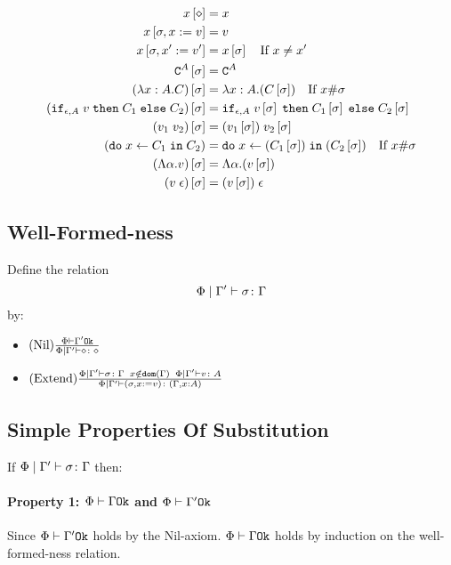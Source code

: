 {        
        \begin{align}
            x\left[\diamond\right] & = x \\
            x\left[\sigma,x:= v\right] & = v \\
            x\left[\sigma,x':= v'\right] & = x\left[\sigma\right]\quad\text{If }x \neq x'\\
            \texttt{C}^{A}\left[\sigma\right] & = \texttt{C}^{A} \\
            (\lambda x : A. C)\left[\sigma\right] &= \lambda x : A. (C\left[\sigma\right])\quad\text{If }x\#\sigma\\
            (\texttt{if}_{\epsilon, A}\; v\; \texttt{then}\; C_1 \;\texttt{else} \; C_2)\left[\sigma\right] &= \texttt{if}_{\epsilon, A}\; v\left[\sigma\right]\; \texttt{then}\; C_1\left[\sigma\right] \;\texttt{else} \; C_2\left[\sigma\right]\\
            (v_1\; v_2)\left[\sigma\right]&= (v_1\left[\sigma\right])\; v_2\left[\sigma\right]\\
            (\texttt{do}\; x \leftarrow C_1 \;\texttt{in}\; C_2)&= \texttt{do}\; x \leftarrow (C_1\left[\sigma\right]) \;\texttt{in}\; (C_2\left[\sigma\right])\quad\text{If } x\#\sigma\\
            (\Lambda \alpha. v)\left[\sigma\right] & = \Lambda \alpha. (v\left[\sigma\right])\\
            (v\;\epsilon)\left[\sigma\right] & = (v\left[\sigma\right])\;\epsilon\\
        \end{align}
        \subsection{Well-Formed-ness}
    Define the relation $$\Phi\mid\Gamma' \vdash \sigma \colon \Gamma$$ by:

    \begin{itemize}
        \item $(\text{Nil}) \frac{\Phi\vdash \Gamma' \texttt{Ok}}{\Phi\mid\Gamma' \vdash \diamond \colon \diamond}$
        \item $(\text{Extend}) \frac{
            \Phi\mid\Gamma' \vdash \sigma \colon \Gamma
            \;\;
            x\notin\texttt{dom}(\Gamma)
            \;\;
            \Phi\mid\Gamma' \vdash v \colon A
        }{
            \Phi\mid\Gamma' \vdash (\sigma, x := v) \colon (\Gamma, x: A)
        }$
    \end{itemize}
    \subsection{Simple Properties Of Substitution}
    If $\Phi\mid\Gamma' \vdash \sigma \colon \Gamma$ then:

        \paragraph{Property 1: $\Phi\vdash \Gamma \texttt{Ok}$ and $\Phi\vdash \Gamma' \texttt{Ok}$}
         Since $\Phi\vdash \Gamma' \texttt{Ok}$ holds by the Nil-axiom. $\Phi\vdash \Gamma \texttt{Ok}$ holds by induction on the well-formed-ness relation.
}
